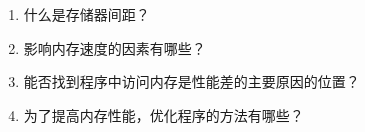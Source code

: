 \begin{enumerate}
\item 什么是存储器间距？
\item 影响内存速度的因素有哪些？
\item 能否找到程序中访问内存是性能差的主要原因的位置？
\item 为了提高内存性能，优化程序的方法有哪些？
\end{enumerate}